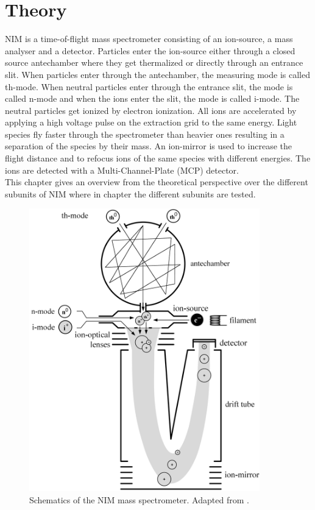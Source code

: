 \section{Theory} %
	 NIM is a time-of-flight mass spectrometer consisting of an ion-source, a mass analyser and a detector. Particles enter the ion-source either through a closed source antechamber where they get thermalized or directly through an entrance slit. When particles enter through the antechamber, the measuring mode is called th-mode. When neutral particles enter through the entrance slit, the mode is called n-mode and when the ions enter the slit, the mode is called i-mode. The neutral particles get ionized by electron ionization. All ions are accelerated by applying a high voltage pulse on the extraction grid to the same energy. Light species fly faster through the spectrometer than heavier ones resulting in a separation of the species by their mass. An ion-mirror is used to increase the flight distance and to refocus ions of the same species with different energies. %
	The ions are detected with a Multi-Channel-Plate (MCP) detector.\\
	This chapter gives an overview from the theoretical perspective over the different subunits of NIM where in chapter  the different subunits are tested.
	\begin{figure}[h]
		\centering
		\includegraphics[width= 10cm]{Bilder/NIM_Sketch.png}
		\caption{Schematics of the NIM mass spectrometer. Adapted from \cite{Diss_Meyer}.}
		\label{fig:NIMSketch}
	\end{figure}
	
